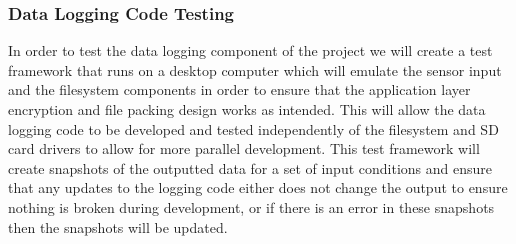 \subsubsection{Data Logging Code Testing}

In order to test the data logging component of the project we will create a test
framework that runs on a desktop computer which will emulate the sensor input
and the filesystem components in order to ensure that the application layer
encryption and file packing design works as intended. This will allow the data
logging code to be developed and tested independently of the filesystem and SD
card drivers to allow for more parallel development. This test framework will
create snapshots of the outputted data for a set of input conditions and ensure
that any updates to the logging code either does not change the output to ensure
nothing is broken during development, or if there is an error in these snapshots
then the snapshots will be updated.

\fi
